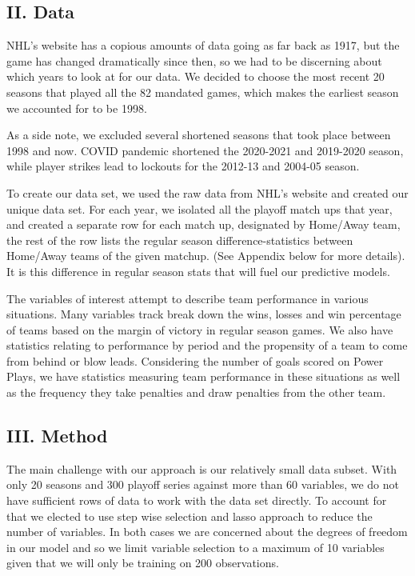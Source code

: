 \documentclass[
]{article}
\begin{document}
\hypertarget{ii.-data}{%
\subsection{II. Data}\label{ii.-data}}

NHL's website has a copious amounts of data going as far back as 1917,
but the game has changed dramatically since then, so we had to be
discerning about which years to look at for our data. We decided to
choose the most recent 20 seasons that played all the 82 mandated games,
which makes the earliest season we accounted for to be 1998.

As a side note, we excluded several shortened seasons that took place
between 1998 and now. COVID pandemic shortened the 2020-2021 and
2019-2020 season, while player strikes lead to lockouts for the 2012-13
and 2004-05 season.

To create our data set, we used the raw data from NHL's website and
created our unique data set. For each year, we isolated all the playoff
match ups that year, and created a separate row for each match up,
designated by Home/Away team, the rest of the row lists the regular
season difference-statistics between Home/Away teams of the given
matchup. (See Appendix below for more details). It is this difference in
regular season stats that will fuel our predictive models.

The variables of interest attempt to describe team performance in
various situations. Many variables track break down the wins, losses and
win percentage of teams based on the margin of victory in regular season
games. We also have statistics relating to performance by period and the
propensity of a team to come from behind or blow leads. Considering the
number of goals scored on Power Plays, we have statistics measuring team
performance in these situations as well as the frequency they take
penalties and draw penalties from the other team.

\hypertarget{iii.-method}{%
\subsection{III. Method}\label{iii.-method}}

The main challenge with our approach is our relatively small data
subset. With only 20 seasons and 300 playoff series against more than 60
variables, we do not have sufficient rows of data to work with the data
set directly. To account for that we elected to use step wise selection
and lasso approach to reduce the number of variables. In both cases we
are concerned about the degrees of freedom in our model and so we limit
variable selection to a maximum of 10 variables given that we will only
be training on 200 observations.
\end{document}
